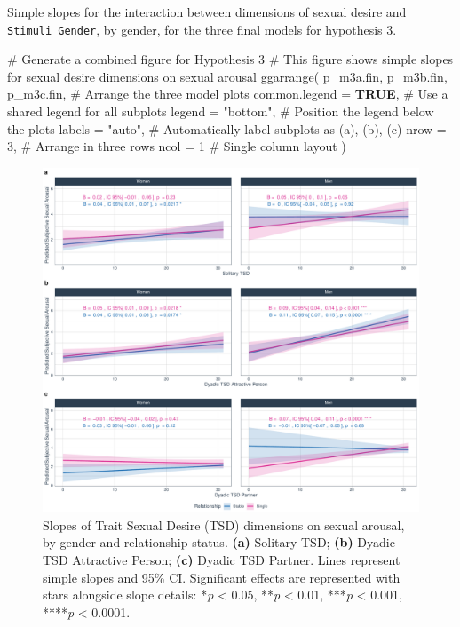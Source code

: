 \documentclass[
  bookmarksnumbered]{article}
\newenvironment{Shaded}{\begin{snugshade}}{\end{snugshade}}
\newcommand{\AttributeTok}[1]{\textcolor[rgb]{0.80,0.80,0.80}{#1}}
\newcommand{\CommentTok}[1]{\textcolor[rgb]{0.50,0.62,0.50}{#1}}
\newcommand{\ConstantTok}[1]{\textcolor[rgb]{0.86,0.64,0.64}{\textbf{#1}}}
\newcommand{\DecValTok}[1]{\textcolor[rgb]{0.86,0.86,0.80}{#1}}
\newcommand{\FunctionTok}[1]{\textcolor[rgb]{0.94,0.94,0.56}{#1}}
\newcommand{\NormalTok}[1]{\textcolor[rgb]{0.80,0.80,0.80}{#1}}
\newcommand{\StringTok}[1]{\textcolor[rgb]{0.80,0.58,0.58}{#1}}
\begin{document}
Simple slopes for the interaction between dimensions of sexual desire and \texttt{Stimuli\ Gender}, by gender, for the three final models for hypothesis 3.

\begin{Shaded}
\begin{Highlighting}[]
\CommentTok{\# Generate a combined figure for Hypothesis 3}
\CommentTok{\# This figure shows simple slopes for sexual desire dimensions on sexual arousal}
\FunctionTok{ggarrange}\NormalTok{(}
\NormalTok{  p\_m3a.fin, p\_m3b.fin, p\_m3c.fin, }\CommentTok{\# Arrange the three model plots}
  \AttributeTok{common.legend =} \ConstantTok{TRUE}\NormalTok{, }\CommentTok{\# Use a shared legend for all subplots}
  \AttributeTok{legend =} \StringTok{"bottom"}\NormalTok{, }\CommentTok{\# Position the legend below the plots}
  \AttributeTok{labels =} \StringTok{"auto"}\NormalTok{, }\CommentTok{\# Automatically label subplots as (a), (b), (c)}
  \AttributeTok{nrow =} \DecValTok{3}\NormalTok{, }\CommentTok{\# Arrange in three rows}
  \AttributeTok{ncol =} \DecValTok{1} \CommentTok{\# Single column layout}
\NormalTok{)}
\end{Highlighting}
\end{Shaded}

\begin{figure}
\centering
\includegraphics{Sexual_Desire_Arousal_files/figure-latex/fig-m3-fin-1.pdf}
\caption{\label{fig:fig-m3-fin}Slopes of Trait Sexual Desire (TSD) dimensions on sexual arousal, by gender and relationship status. \textbf{(a)} Solitary TSD; \textbf{(b)} Dyadic TSD Attractive Person; \textbf{(c)} Dyadic TSD Partner. Lines represent simple slopes and 95\% CI. Significant effects are represented with stars alongside slope details: *\emph{p} \textless{} 0.05, **\emph{p} \textless{} 0.01, ***\emph{p} \textless{} 0.001, ****\emph{p} \textless{} 0.0001.}
\end{figure}
\end{document}
